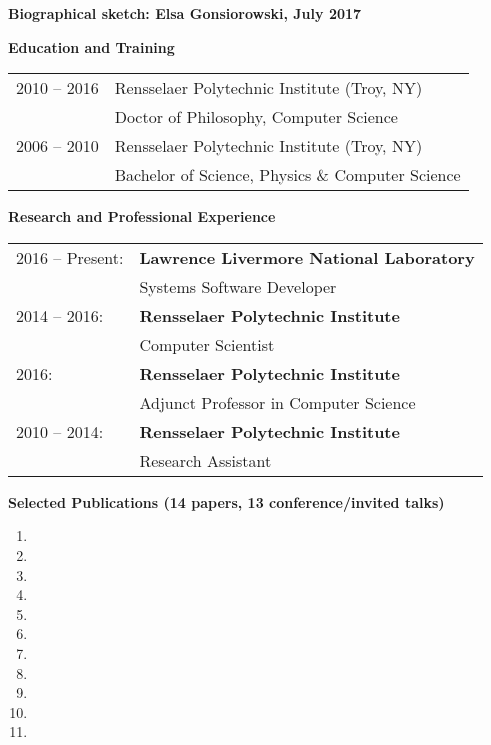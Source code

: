 \documentclass[times,11pt]{article}    %
\begin{document}
\begin{center}
\textbf{\sffamily\large Biographical sketch: Elsa Gonsiorowski, July 2017}
\end{center}

\vskip 3pt
\textbf{\sffamily Education and Training}
\vskip 3pt

\begin{tabular}{ll}
\\
2010 -- 2016 & Rensselaer Polytechnic Institute (Troy, NY)\\
             & Doctor of Philosophy, Computer Science\\
2006 -- 2010 & Rensselaer Polytechnic Institute (Troy, NY)\\
             & Bachelor of Science, Physics \& Computer Science\\
\end{tabular}

\vskip 3pt
\textbf{\sffamily Research and Professional Experience}
\vskip 3pt

\begin{tabular}{ll}
2016 -- Present: & 
\textbf{Lawrence Livermore National Laboratory}\\
 & Systems Software Developer \\

2014 -- 2016: &
\textbf{Rensselaer Polytechnic Institute}\\
 & Computer Scientist \\

2016: & 
\textbf{Rensselaer Polytechnic Institute}\\
 & Adjunct Professor in Computer Science \\

2010 -- 2014: & 
\textbf{Rensselaer Polytechnic Institute}\\
 & Research Assistant \\
\end{tabular}

\vskip 3pt
\textbf{\sffamily Selected Publications (14 papers, 13 conference/invited talks)}

\begin{enumerate}
\item {}
\item {}
\item {}
\item {}
\item {}
\item {}
\item {}
\item {}
\item {}
\item {}
\item {}
\end{enumerate}
\end{document}
